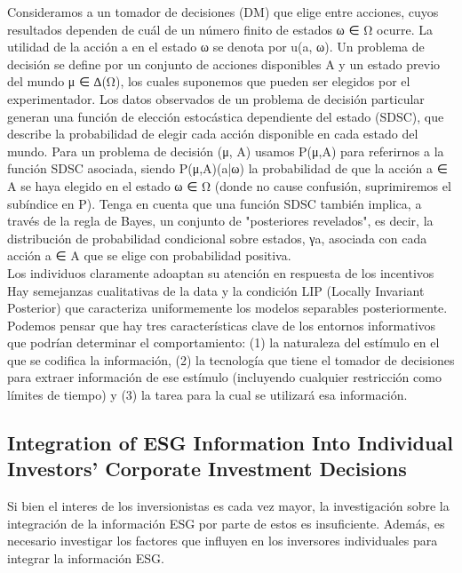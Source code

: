 \documentclass[11pt,letterpaper]{article}
\begin{document}
Consideramos a un tomador de decisiones (DM) que elige entre acciones, cuyos resultados dependen de cuál de un número finito de estados ω ∈ Ω ocurre. La utilidad de la acción a en el estado ω se denota por u(a, ω). Un problema de decisión se define por un conjunto de acciones disponibles A y un estado previo del mundo μ ∈ ∆(Ω), los cuales suponemos que pueden ser elegidos por el experimentador. Los datos observados de un problema de decisión particular generan una función de elección estocástica dependiente del estado (SDSC), que describe la probabilidad de elegir cada acción disponible en cada estado del mundo. Para un problema de decisión (μ, A) usamos P(μ,A) para referirnos a la función SDSC asociada, siendo P(μ,A)(a|ω) la probabilidad de que la acción a ∈ A se haya elegido en el estado ω ∈ Ω (donde no cause confusión, suprimiremos el subíndice en P). Tenga en cuenta que una función SDSC también implica, a través de la regla de Bayes, un conjunto de "posteriores revelados", es decir, la distribución de probabilidad condicional sobre estados, γa, asociada con cada acción a ∈ A que se elige con probabilidad positiva.\\

Los individuos claramente adoaptan su atención en respuesta de los incentivos\\

Hay semejanzas cualitativas de la data  y la condición LIP (Locally Invariant Posterior) que caracteriza uniformemente los modelos separables posteriormente.\\

Podemos pensar que hay tres características clave de los entornos informativos que podrían determinar el comportamiento: (1) la naturaleza del estímulo en el que se codifica la información, (2) la tecnología que tiene el tomador de decisiones para extraer información de ese estímulo (incluyendo cualquier restricción como límites de tiempo) y (3) la tarea para la cual se utilizará esa información.\\

\subsection{Integration of ESG Information Into Individual Investors' Corporate Investment Decisions}

Si bien el interes de los inversionistas es cada vez mayor, la investigación sobre la integración de la información ESG por parte de estos es insuficiente. Además, es necesario investigar los factores que influyen en los inversores individuales para integrar la información ESG.\\
\end{document}

